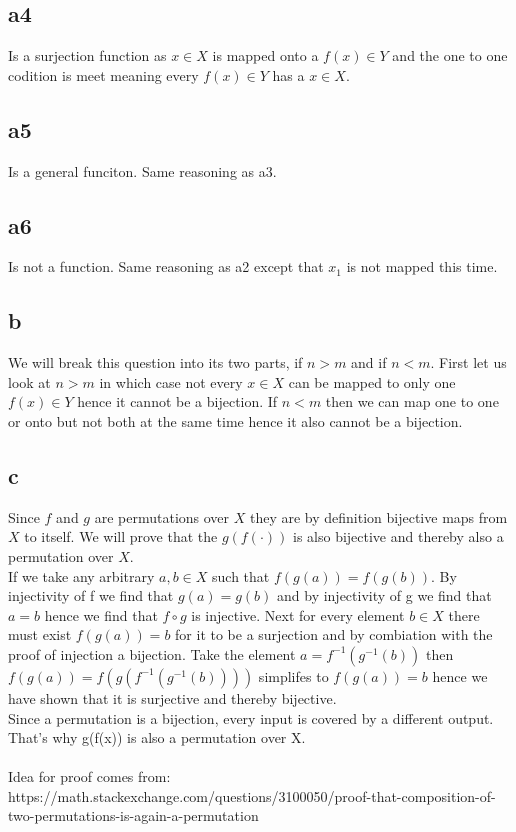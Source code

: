 \documentclass{article}
\theoremstyle{definition}
\theoremstyle{remark}
\begin{document}
\subsection*{a4} Is a surjection function as $x \in X$ is mapped onto a $f(x) \in Y$ and the one to one codition is meet meaning every $f(x) \in Y$ has a $x \in X$.
\subsection*{a5} Is a general funciton. Same reasoning as a3.
\subsection*{a6} Is not a function. Same reasoning as a2 except that $x_1$ is not mapped this time.
\subsection*{b}
We will break this question into its two parts, if $n>m$ and if $n<m$. First let us look at $n>m$ in which case not every $x \in X$ can be mapped to only one $f(x) \in Y$ hence it cannot be a bijection. If $n<m$ then we can map one to one or onto but not both at the same time hence it also cannot be a bijection.
\subsection*{c}
Since $f$ and $g$ are permutations over $X$ they are by definition bijective maps from $X$ to itself. We will prove that the $g(f(\cdot))$ is also bijective and thereby also a permutation over $X$.\\
If we take any arbitrary $a,b\in X$ such that $f(g(a)) = f(g(b))$. By injectivity of f we find that $g(a) = g(b)$ and by injectivity of g we find that $a=b$ hence we find that $f\circ g$ is injective. Next for every element $b\in X$ there must exist $f(g(a)) = b$ for it to be a surjection and by combiation with the proof of injection a bijection. Take the element $a=f^{-1}(g^{-1}(b))$ then  $f(g(a))=f(g(f^{-1}(g^{-1}(b))))$ simplifes to $f(g(a)) = b$ hence we have shown that it is surjective and thereby bijective.\\ 
Since a permutation is a bijection, every input is covered by a different output. That’s why g(f(x)) is also a permutation over X.
\\\\
Idea for proof comes from:\\
https://math.stackexchange.com/questions/3100050/proof-that-composition-of-two-permutations-is-again-a-permutation
\\
\end{document}
